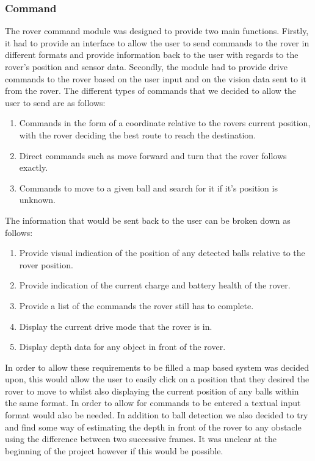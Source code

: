 \documentclass[10pt,twoside]{article}
\begin{document}
\subsubsection{Command}
The rover command module was designed to provide two main functions. Firstly, it had to provide an interface to allow the user to send commands to the rover in different formats and provide information back to the user with regards to the rover's position and sensor data. Secondly, the module had to provide drive commands to the rover based on the user input and on the vision data sent to it from the rover. 
\smallbreak
The different types of commands that we decided to allow the user to send are as follows:
\begin{enumerate}
  \item Commands in the form of a coordinate relative to the rovers current position, with the rover deciding the best route to reach the destination.
  \item Direct commands such as move forward and turn that the rover follows exactly.
  \item Commands to move to a given ball and search for it if it's position is unknown. 
\end{enumerate}
The information that would be sent back to the user can be broken down as follows:
\begin{enumerate}
  \item Provide visual indication of the position of any detected balls relative to the rover position.
  \item Provide indication of the current charge and battery health of the rover.
  \item Provide a list of the commands the rover still has to complete.
  \item Display the current drive mode that the rover is in.
  \item Display depth data for any object in front of the rover.
\end{enumerate}
In order to allow these requirements to be filled a map based system was decided upon, this would allow the user to easily click on a position that they desired the rover to move to whilst also displaying the current position of any balls within the same format. In order to allow for commands to be entered a textual input format would also be needed. In addition to ball detection we also decided to try and find some way of estimating the depth in front of the rover to any obstacle using the difference between two successive frames. It was unclear at the beginning of the project however if this would be possible.
\end{document}
